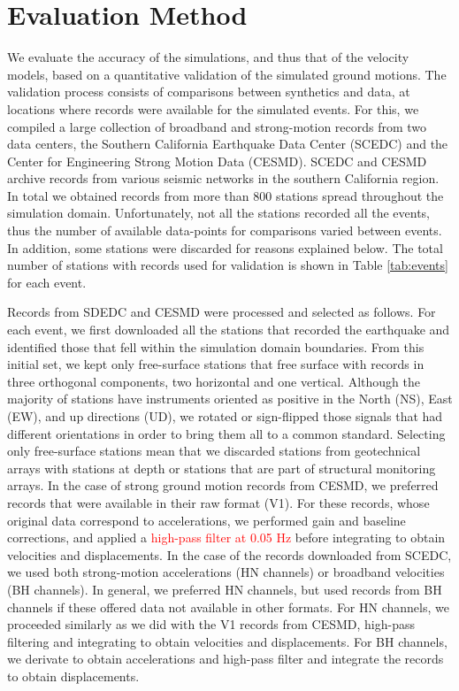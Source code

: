 
\section{Evaluation Method}

We evaluate the accuracy of the simulations, and thus that of the velocity models, based on a quantitative validation of the simulated ground motions. The validation process consists of comparisons between synthetics and data, at locations where records were available for the simulated events. For this, we compiled a large collection of broadband and strong-motion records from two data centers, the Southern California Earthquake Data Center (SCEDC) and the Center for Engineering Strong Motion Data (CESMD). SCEDC and CESMD archive records from various seismic networks in the southern California region. In total we obtained records from more than 800 stations spread throughout the simulation domain. Unfortunately, not all the stations recorded all the events, thus the number of available data-points for comparisons varied between events. In addition, some stations were discarded for reasons explained below. The total number of stations with records used for validation is shown in Table \ref{tab:events} for each event.

Records from SDEDC and CESMD were processed and selected as follows. For each event, we first downloaded all the stations that recorded the earthquake and identified those that fell within the simulation domain boundaries. From this initial set, we kept only free-surface stations that free surface with records in three orthogonal components, two horizontal and one vertical. Although the majority of stations have instruments oriented as positive in the North (NS), East (EW), and up directions (UD), we rotated or sign-flipped those signals that had different orientations in order to bring them all to a common standard. Selecting only free-surface stations mean that we discarded stations from geotechnical arrays with stations at depth or stations that are part of structural monitoring arrays. In the case of strong ground motion records from CESMD, we preferred records that were available in their raw format (V1). For these records, whose original data correspond to accelerations, we performed gain and baseline corrections, and applied a \textcolor{red}{high-pass filter at 0.05 Hz} before integrating to obtain velocities and displacements. In the case of the records downloaded from SCEDC, we used both strong-motion accelerations (HN channels) or broadband velocities (BH channels). In general, we preferred HN channels, but used records from BH channels if these offered data not available in other formats. For HN channels, we proceeded similarly as we did with the V1 records from CESMD, high-pass filtering and integrating to obtain velocities and displacements. For BH channels, we derivate to obtain accelerations and high-pass filter and integrate the records to obtain displacements. 



